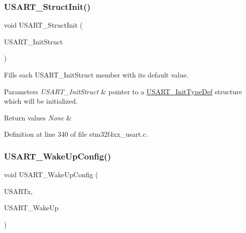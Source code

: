 \subsubsection{\texorpdfstring{U\+S\+A\+R\+T\+\_\+\+Struct\+Init()}{USART\_StructInit()}}
{\footnotesize\ttfamily void U\+S\+A\+R\+T\+\_\+\+Struct\+Init (\begin{DoxyParamCaption}\item[{\hyperlink{struct_u_s_a_r_t___init_type_def}{U\+S\+A\+R\+T\+\_\+\+Init\+Type\+Def} $\ast$}]{U\+S\+A\+R\+T\+\_\+\+Init\+Struct }\end{DoxyParamCaption})}



Fills each U\+S\+A\+R\+T\+\_\+\+Init\+Struct member with its default value. 


\begin{DoxyParams}{Parameters}
{\em U\+S\+A\+R\+T\+\_\+\+Init\+Struct} & pointer to a \hyperlink{struct_u_s_a_r_t___init_type_def}{U\+S\+A\+R\+T\+\_\+\+Init\+Type\+Def} structure which will be initialized. \\
\hline
\end{DoxyParams}

\begin{DoxyRetVals}{Return values}
{\em None} & \\
\hline
\end{DoxyRetVals}


Definition at line 340 of file stm32f4xx\+\_\+usart.\+c.

\mbox{\label{group___u_s_a_r_t_ga4965417c2412c36e462fcad50a8d5393}} 
\subsubsection{\texorpdfstring{U\+S\+A\+R\+T\+\_\+\+Wake\+Up\+Config()}{USART\_WakeUpConfig()}}
{\footnotesize\ttfamily void U\+S\+A\+R\+T\+\_\+\+Wake\+Up\+Config (\begin{DoxyParamCaption}\item[{\hyperlink{struct_u_s_a_r_t___type_def}{U\+S\+A\+R\+T\+\_\+\+Type\+Def} $\ast$}]{U\+S\+A\+R\+Tx,  }\item[{uint16\+\_\+t}]{U\+S\+A\+R\+T\+\_\+\+Wake\+Up }\end{DoxyParamCaption})}



